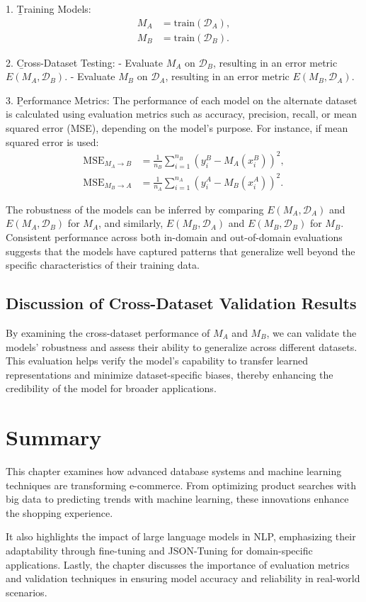 1. \b{Training Models}: 
   \begin{align}
       M_A &= \text{train}(\mathcal{D}_A), \\
       M_B &= \text{train}(\mathcal{D}_B).
   \end{align}

2. \b{Cross-Dataset Testing}: 
   - Evaluate $M_A$ on $\mathcal{D}_B$, resulting in an error metric $E(M_A, \mathcal{D}_B)$.
   - Evaluate $M_B$ on $\mathcal{D}_A$, resulting in an error metric $E(M_B, \mathcal{D}_A)$.

3. \b{Performance Metrics}: 
   The performance of each model on the alternate dataset is calculated using evaluation metrics such as accuracy, precision, recall, or mean squared error (MSE), depending on the model's purpose. For instance, if mean squared error is used:
   \begin{align}
       \text{MSE}_{M_A \rightarrow B} &= \frac{1}{n_B} \sum_{i=1}^{n_B} \left(y_i^B - M_A(x_i^B)\right)^2, \\
       \text{MSE}_{M_B \rightarrow A} &= \frac{1}{n_A} \sum_{i=1}^{n_A} \left(y_i^A - M_B(x_i^A)\right)^2.
   \end{align}

The robustness of the models can be inferred by comparing $E(M_A, \mathcal{D}_A)$ and $E(M_A, \mathcal{D}_B)$ for $M_A$, and similarly, $E(M_B, \mathcal{D}_A)$ and $E(M_B, \mathcal{D}_B)$ for $M_B$. Consistent performance across both in-domain and out-of-domain evaluations suggests that the models have captured patterns that generalize well beyond the specific characteristics of their training data.

\subsection{Discussion of Cross-Dataset Validation Results}

By examining the cross-dataset performance of $M_A$ and $M_B$, we can validate the models' robustness and assess their ability to generalize across different datasets. This evaluation helps verify the model's capability to transfer learned representations and minimize dataset-specific biases, thereby enhancing the credibility of the model for broader applications.

\section{Summary}

This chapter examines how advanced database systems and machine learning techniques are transforming e-commerce. From optimizing product searches with big data to predicting trends with machine learning, these innovations enhance the shopping experience.

It also highlights the impact of large language models in NLP, emphasizing their adaptability through fine-tuning and JSON-Tuning for domain-specific applications. Lastly, the chapter discusses the importance of evaluation metrics and validation techniques in ensuring model accuracy and reliability in real-world scenarios.
